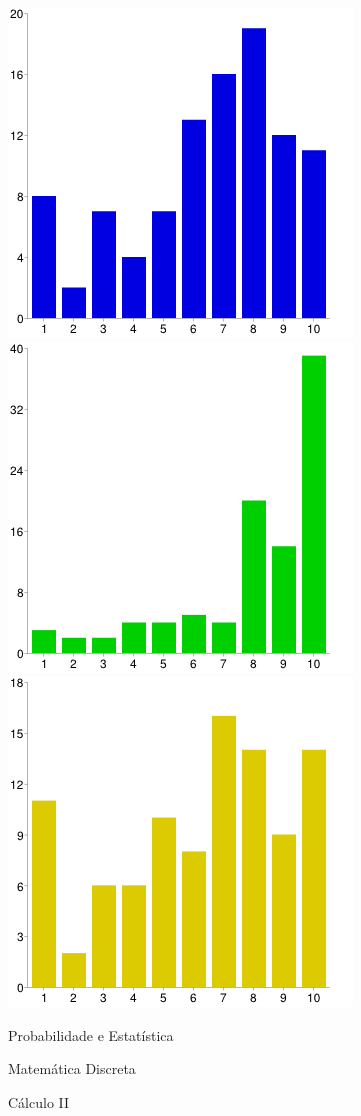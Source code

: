 \documentclass[12pt,a4paper]{article}
\begin{document}
\begin{figure}[!h]
\center
\includegraphics[scale=0.36]{imagens/fig10.png} 
\includegraphics[scale=0.36]{imagens/fig11.png}
\includegraphics[scale=0.36]{imagens/fig12.png} 
\caption{Probabilidade e Estatística} 
\caption{Matemática Discreta}
\caption{Cálculo II}

\end{figure}
\end{document}
